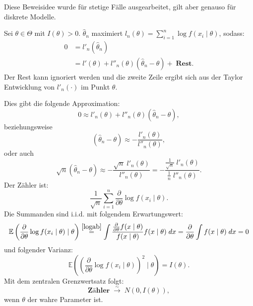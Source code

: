 \documentclass[10pt]{article}
\newcommand{\EW}{\mathbb{E}} %
\newcommand{\KV}{\overset{\sim} \longrightarrow} %
\newcommand{\xt}{x \mid \theta} %
\newcommand{\ablt}{\frac{\partial}{\partial \theta}}
\newenvironment{BWS}[1][]
{\begin{Beweis}[frametitle=#1]}{\end{Beweis}}
\begin{document}
	\begin{BWS}[Beweisidee 1.3.6 (Verteilung des Schätzfehlers)]
		Diese Beweisidee wurde für stetige Fälle ausgearbeitet, gilt aber genauso für diskrete Modelle. 
		
		Sei $\theta \in \Theta$ mit $I(\theta) > 0$. $\hat{\theta}_n$ maximiert $l_n (\theta) = \sum_{i=1}^{n} \log f (x_i \mid \theta)$, sodass:
		\begin{equation*}
			\begin{split}
				0 &= l'_n (\hat{\theta}_n) \\
				&= l'(\theta) + l''_n(\theta) (\hat{\theta}_n - \theta) + \; \textbf{Rest}.
			\end{split}
		\end{equation*}
		Der Rest kann ignoriert werden und die zweite Zeile ergibt sich aus der Taylor Entwicklung von $l'_{n}(\cdot)$ im Punkt $\theta$. 
		
		Dies gibt die folgende Approximation:
		\begin{equation*}
			0 \approx l'_n (\theta) +  l''_n(\theta) (\hat{\theta}_n - \theta),
		\end{equation*}
		beziehungsweise
		\begin{equation*}
			(\hat{\theta}_n - \theta) \approx -\frac{l'_n (\theta)}{l''_n(\theta)},
		\end{equation*}
		oder auch
		\begin{equation*}
			\sqrt{n} (\hat{\theta}_n - \theta) \approx -\frac{\sqrt{n}\;l'_n(\theta)}{l''_n(\theta)} = -\frac{\frac{1}{\sqrt{n} } \; l'_n(\theta)}{\frac{1}{n}\;l''_n(\theta)}.
		\end{equation*}
		Der Zähler ist:
		\begin{equation*}
			\frac{1}{\sqrt{n}}\sum_{i=1}^{n} \frac{\partial}{\partial \theta} \log f(x_i \mid \theta).
		\end{equation*}
		Die Summanden sind i.i.d. mit folgendem Erwartungswert:
		\begin{equation*}
			\EW\left(\ablt \log f(x_i \mid \theta) \mid \theta\right) \overset{\ref{logab}}{=} \int \frac{\ablt f(x \mid \theta)}{f(\xt)} f(\xt) \; dx = \ablt \int f(\xt) \; dx = 0
		\end{equation*}
		und folgender Varianz:
		\begin{equation*}
			\EW\left(\left(\ablt \log f(x_i \mid \theta)\right)^2 \mid \theta\right) = I(\theta).
		\end{equation*}
		Mit dem zentralen Grenzwertsatz folgt:
		\begin{equation*}
			\textbf{Zähler} \; \KV \; N(0,I(\theta)),
		\end{equation*}
		wenn $\theta$ der wahre Parameter ist.
		

\end{BWS}
\end{document}
